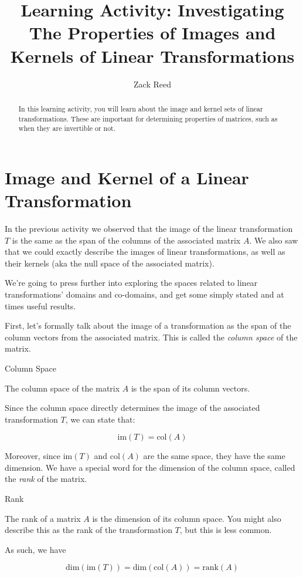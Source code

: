 \documentclass{ximera}
\author{Zack Reed}
\title{Learning Activity: Investigating The Properties of Images and Kernels of Linear Transformations}\license{CC BY-NC-SA 4.0}
\begin{document}
\begin{abstract}
    In this learning activity, you will learn about the image and kernel sets of linear transformations. These are important for determining properties of matrices, such as when they are invertible or not.
\end{abstract}
\maketitle


\section*{Image and Kernel of a Linear Transformation}

 
 
In the previous activity we observed that the image of the linear transformation $T$ is the same as the span of the columns of the associated matrix $A$. We also saw that we could exactly describe the images of linear transformations, as well as their kernels (aka the null space of the associated matrix).

We're going to press further into exploring the spaces related to linear transformations' domains and co-domains, and get some simply stated and at times useful results.

First, let's formally talk about the image of a transformation as the span of the column vectors from the associated matrix. This is called the \emph{column space} of the matrix.

\begin{definition}{Column Space}

The column space of the matrix $A$ is the span of its column vectors.

Since the column space directly determines the image of the associated transformation $T$, we can state that:

$$\mbox{im}(T)=\mbox{col}(A)$$
\end{definition}

Moreover, since $\mbox{im}(T)$ and $\mbox{col}(A)$ are the same space, they have the same dimension. We have a special word for the dimension of the column space, called the \emph{rank} of the matrix. 

\begin{definition}{Rank}

  The rank of a matrix $A$ is the dimension of its column space. You might also describe this as the rank of the transformation $T$, but this is less common. 

  As such, we have

$$\mbox{dim}(\mbox{im}(T))=\mbox{dim}(\mbox{col}(A))=\mbox{rank}(A)$$
\end{definition}
 
\end{document}
